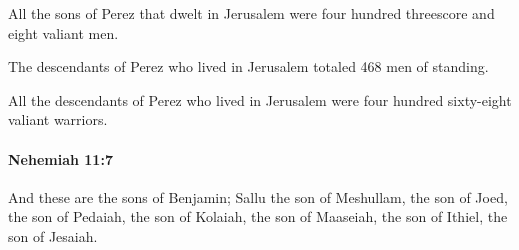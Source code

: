 			\begin{versebox}
					\item[BHS] 
					\item[LXX] 
					\item[ASV] All the sons of Perez that dwelt in Jerusalem were four hundred threescore and eight valiant men.
					\item[NIV] The descendants of Perez who lived in Jerusalem totaled 468 men of standing.
					\item[NRSV] All the descendants of Perez who lived in Jerusalem were four hundred sixty-eight valiant warriors.
			\end{versebox}

		\paragraph{Nehemiah 11:7} %
			\label{NEHEMIAH-11-7}

			And these are the sons of Benjamin; Sallu the son of Meshullam, the son of Joed, the son of Pedaiah, the son of Kolaiah, the son of Maaseiah, the son of Ithiel, the son of Jesaiah.

